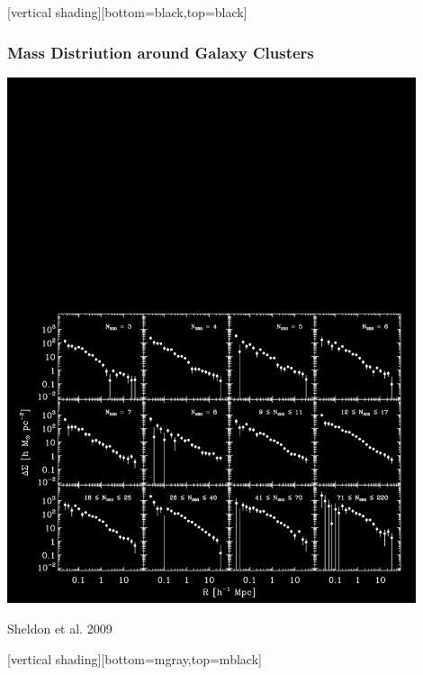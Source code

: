 \documentclass{beamer}
\begin{document}
{
    [vertical shading][bottom=black,top=black]


    \frame
    {
        \frametitle{Mass Distriution around Galaxy Clusters}

        \begin{center}
            \includegraphics[trim=0 0 0 800,clip,width=0.9\textwidth]{maxbcg_sample21-22_ngals200_12_jackknife_icolor.png}
        \end{center}
        \hfill {\color{gold} Sheldon et al. 2009}
    }
    [vertical shading][bottom=mgray,top=mblack]
}
\end{document}
